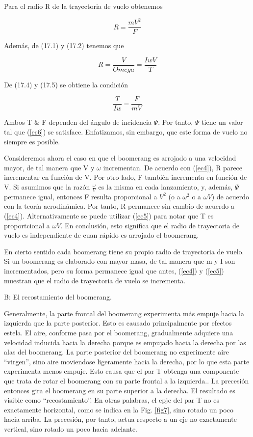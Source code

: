 	Para el radio R de la trayectoria de vuelo obtenemos

		\begin{equation}
		R = \frac{mV^{2}}{F}
		\label{ec4}
		\end{equation} %

	Además, de (17.1) y (17.2) tenemos que

		\begin{equation}
		R = \frac{V}{Omega} = \frac{IwV}{T}
		\label{ec5}
		\end{equation} %

	De (17.4) y (17.5) se obtiene la condición

		\begin{equation}
		\frac{T}{Iw} = \frac{F}{mV}
		\label{ec6}
		\end{equation} %

	Ambos T $\&$ F dependen del ángulo de incidencia $\Psi$. Por tanto, $\Psi$ tiene un valor tal que (\ref{ec6}) se satisface. Enfatizamos, sin embargo, que este forma de vuelo no siempre es posible.

	Consideremos ahora el caso en que el boomerang es arrojado a una velocidad mayor, de tal manera que V y $\omega$ incrementan. De acuerdo con (\ref{ec4}), R parece incrementar en función de V. Por otro lado, F también incrementa en función de V. Si asumimos que la razón $\frac{\omega}{V}$ es la misma en cada lanzamiento, y, además, $\Psi$ permanece igual, entonces F resulta proporcional a $V^{2}$ (o a $\omega^{2}$ o a $\omega V$) de acuerdo con la teoría aerodinámica. Por tanto, R permanece sin cambio de acuerdo a (\ref{ec4}). Alternativamente se puede utilizar (\ref{ec5}) para notar que T es proportcional a $\omega V$. En conclusión, esto significa que el radio de trayectoria de vuelo es independiente de cuan rápido es arrojado el boomerang.

	En cierto sentido cada boomerang tiene su propio radio de trayectoria de vuelo. Si un boomerang es elaborado con mayor masa, de tal manera que m y I son incrementados, pero su forma permanece igual que antes, (\ref{ec4}) y (\ref{ec5}) muestran que el radio de trayectoria de vuelo se incrementa.


		B: El recostamiento del boomerang.

	Generalmente, la parte frontal del boomerang experimenta más empuje hacia la izquierda que la parte posterior. Esto es causado principalmente por efectos estela. El aire, conforme pasa por el boomerang, gradualmente adquiere una velocidad inducida hacia la derecha porque es empujado hacia la derecha por las alas del boomerang. La parte posterior del boomerang no experimente aire “virgen”, sino aire moviendose ligeramente hacia la derecha, por lo que esta parte experimenta menos empuje. Esto causa que el par T obtenga una componente que trata de rotar el boomerang con su parte frontal a la izquierda.. La precesión entonces gira el boomerang en su parte superior a la derecha. El resultado es visible como “recostamiento”. En otras palabras, el epje del par T no es exactamente horizontal, como se indica en la Fig. \ref{fig7}, sino rotado un poco hacia arriba. La precesión, por tanto, actua respecto a un eje no exactamente vertical, sino rotado un poco hacia adelante.


